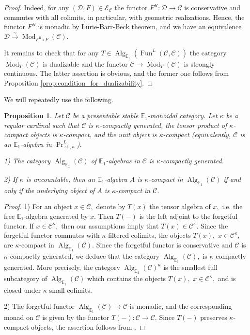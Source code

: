 \documentclass[11pt,leqno]{amsart}
\newtheorem{prop}[theo]{Proposition}
\numberwithin{equation}{section}
\newcommand{\xto}{\xrightarrow}
\newcommand{\st}{\operatorname{st}}
\newcommand{\bE}{{\mathbb E}}
\newcommand{\cD}{{\mathcal D}}
\newcommand{\cC}{{\mathcal C}}
\newcommand{\cE}{{\mathcal E}}
\newcommand{\Fun}{\operatorname{Fun}}
\newcommand{\Alg}{\operatorname{Alg}}
\newcommand{\Mod}{\operatorname{Mod}}
\begin{document}
\begin{proof}Indeed, for any $(\cD,F)\in \cE_{\cC}$ the functor $F^R:\cD\to\cC$ is conservative and commutes with all colimits, in particular, with geometric realizations. Hence, the functor $F^R$ is monadic by Lurie-Barr-Beck theorem, and we have an equivalence $\cD\xto{\sim}\Mod_{F^R\circ F}(\cC).$

It remains to check that for any $T\in\Alg_{\bE_1}(\Fun^{L}(\cC,\cC))$ the category $\Mod_T(\cC)$ is dualizable and the functor $\cC\to\Mod_T(\cC)$ is strongly continuous. The latter assertion is obvious, and the former one follows from Proposition \ref{prop:condition_for_dualizability}.\end{proof}

We will repeatedly use the following.

\begin{prop}\label{prop:E_1-algebras_in_monoidal_cats} Let $\cC$ be a presentable stable $\bE_1$-monoidal category. Let $\kappa$ be a regular cardinal such that $\cC$ is $\kappa$-compactly generated, the tensor product of $\kappa$-compact objects is $\kappa$-compact, and the unit object is $\kappa$-compact (equivalently, $\cC$ is an $\bE_1$-algebra in $\Pr^L_{\st,\kappa}$). 

1) The category $\Alg_{\bE_1}(\cC)$ of $\bE_1$-algebras in $\cC$ is $\kappa$-compactly generated.

2) If $\kappa$ is uncountable, then an $\bE_1$-algebra $A$ is $\kappa$-compact in $\Alg_{\bE_1}(\cC)$ if and only if the underlying object of $A$ is $\kappa$-compact in $\cC.$ 
\end{prop}

\begin{proof}1) For an object $x\in\cC,$ denote by $T(x)$ the tensor algebra of $x,$ i.e. the free $\bE_1$-algebra generated by $x.$ Then $T(-)$ is the left adjoint to the forgetful functor. If $x\in\cC^{\kappa},$ then our assumptions imply that $T(x)\in\cC^{\kappa}.$ Since the forgetful functor commutes with $\kappa$-filtered colimits, the objects $T(x),$ $x\in\cC^{\kappa},$ are $\kappa$-compact in $\Alg_{\bE_1}(\cC).$ Since the forgetful functor is conservative and $\cC$ is $\kappa$-compactly generated, we deduce that the category $\Alg_{\bE_1}(\cC),$ is $\kappa$-compactly generated. More precisely, the category $\Alg_{\bE_1}(\cC)^{\kappa}$ is the smallest full subcategory of $\Alg_{\bE_1}(\cC)$ which contains the objects $T(x),$ $x\in\cC^{\kappa},$ and is closed under $\kappa$-small colimits.

2) The forgetful functor $\Alg_{\bE_1}(\cC)\to\cC$ is monadic, and the corresponding monad on $\cC$ is given by the functor $T(-):\cC\to\cC.$ Since $T(-)$ preserves $\kappa$-compact objects, the assertion follows from \cite[Lemma 6.17]{BSY}.\end{proof} 
\end{document}
